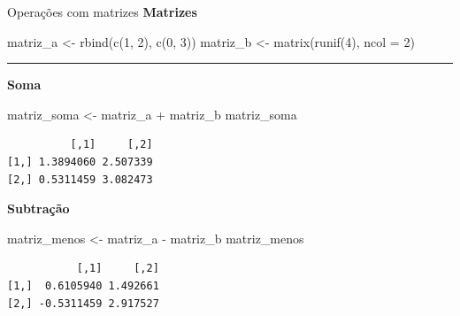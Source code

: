 \documentclass[
  10pt,
  ignorenonframetext,
]{beamer}
\newenvironment{Shaded}{\begin{snugshade}}{\end{snugshade}}
\newcommand{\AttributeTok}[1]{\textcolor[rgb]{0.40,0.45,0.13}{#1}}
\newcommand{\DecValTok}[1]{\textcolor[rgb]{0.68,0.00,0.00}{#1}}
\newcommand{\FunctionTok}[1]{\textcolor[rgb]{0.28,0.35,0.67}{#1}}
\newcommand{\NormalTok}[1]{\textcolor[rgb]{0.00,0.23,0.31}{#1}}
\newcommand{\OtherTok}[1]{\textcolor[rgb]{0.00,0.23,0.31}{#1}}
\newcommand{\SpecialCharTok}[1]{\textcolor[rgb]{0.37,0.37,0.37}{#1}}
\newcommand*{\regrafina}{\rule{\textwidth}{0.5pt}}
\begin{document}
\begin{frame}[fragile]{Operações com matrizes}
\protect\hypertarget{operauxe7uxf5es-com-matrizes}{}
\textbf{Matrizes}

\begin{Shaded}
\begin{Highlighting}[]
\NormalTok{matriz\_a }\OtherTok{\textless{}{-}} \FunctionTok{rbind}\NormalTok{(}\FunctionTok{c}\NormalTok{(}\DecValTok{1}\NormalTok{, }\DecValTok{2}\NormalTok{), }\FunctionTok{c}\NormalTok{(}\DecValTok{0}\NormalTok{, }\DecValTok{3}\NormalTok{))}
\NormalTok{matriz\_b }\OtherTok{\textless{}{-}} \FunctionTok{matrix}\NormalTok{(}\FunctionTok{runif}\NormalTok{(}\DecValTok{4}\NormalTok{), }\AttributeTok{ncol =} \DecValTok{2}\NormalTok{)}
\end{Highlighting}
\end{Shaded}

\regrafina

\small

\textbf{Soma}

\begin{Shaded}
\begin{Highlighting}[]
\NormalTok{matriz\_soma }\OtherTok{\textless{}{-}}\NormalTok{ matriz\_a }\SpecialCharTok{+}\NormalTok{ matriz\_b}
\NormalTok{matriz\_soma}
\end{Highlighting}
\end{Shaded}

\begin{verbatim}
          [,1]     [,2]
[1,] 1.3894060 2.507339
[2,] 0.5311459 3.082473
\end{verbatim}

\textbf{Subtração}

\begin{Shaded}
\begin{Highlighting}[]
\NormalTok{matriz\_menos }\OtherTok{\textless{}{-}}\NormalTok{ matriz\_a }\SpecialCharTok{{-}}\NormalTok{ matriz\_b}
\NormalTok{matriz\_menos}
\end{Highlighting}
\end{Shaded}

\begin{verbatim}
           [,1]     [,2]
[1,]  0.6105940 1.492661
[2,] -0.5311459 2.917527
\end{verbatim}

\normalsize
\end{frame}
\end{document}
